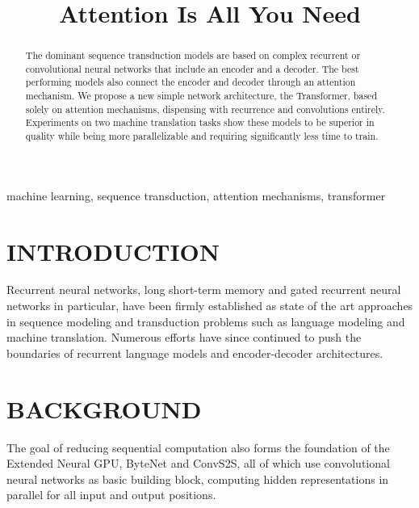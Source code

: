 \documentclass[conference]{IEEEtran}
\begin{document}
\title{Attention Is All You Need}

\author{
}

\maketitle

\begin{abstract}
The dominant sequence transduction models are based on complex recurrent or convolutional neural networks that include an encoder and a decoder. The best performing models also connect the encoder and decoder through an attention mechanism. We propose a new simple network architecture, the Transformer, based solely on attention mechanisms, dispensing with recurrence and convolutions entirely. Experiments on two machine translation tasks show these models to be superior in quality while being more parallelizable and requiring significantly less time to train.
\end{abstract}

\begin{IEEEkeywords}
machine learning, sequence transduction, attention mechanisms, transformer
\end{IEEEkeywords}

\section{INTRODUCTION}
Recurrent neural networks, long short-term memory and gated recurrent neural networks in particular, have been firmly established as state of the art approaches in sequence modeling and transduction problems such as language modeling and machine translation. Numerous efforts have since continued to push the boundaries of recurrent language models and encoder-decoder architectures.

\section{BACKGROUND}
The goal of reducing sequential computation also forms the foundation of the Extended Neural GPU, ByteNet and ConvS2S, all of which use convolutional neural networks as basic building block, computing hidden representations in parallel for all input and output positions.
\end{document}

